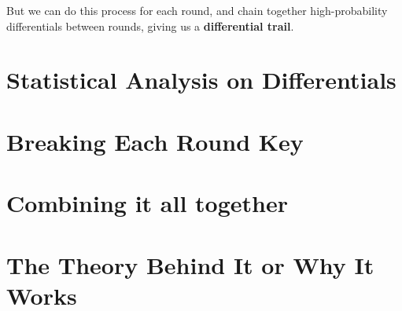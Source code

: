But we can do this process for each round, and chain together
high-probability differentials between rounds, giving us a 
\textbf{differential trail}.


\section{Statistical Analysis on Differentials}

\section{Breaking Each Round Key}

\section{Combining it all together}

\section{The Theory Behind It or Why It Works}


